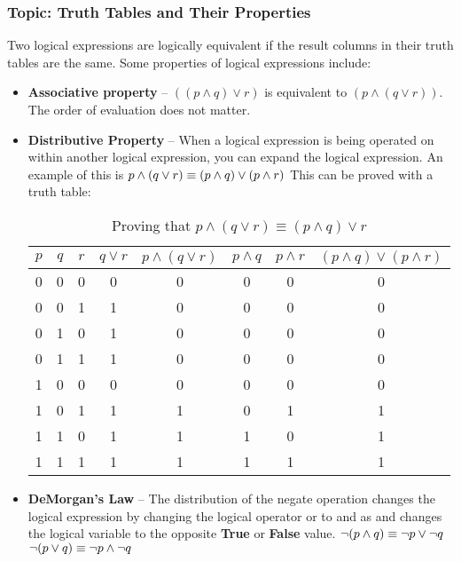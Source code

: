 \documentclass{article}
\begin{document}
\subsubsection{Topic: Truth Tables and Their Properties}

Two logical expressions are logically equivalent if the result columns in their truth tables are the same. Some properties of logical expressions include:
\begin{itemize}
  \item \textbf{Associative property} – $((p \land q) \lor r)$ is equivalent to $(p \land (q \lor r))$. The order of evaluation does not matter.

  \item \textbf{Distributive Property} – When a logical expression is being operated on within another logical expression, you can expand the logical expression.
An example of this is $p\wedge(q\vee r) \equiv (p\wedge q)\vee(p \wedge r)\\$
This can be proved with a truth table:

\begin{table}[ht]
    \centering
    \begin{tabular}{|c|c|c|c|c|c|c|c|} \hline 
         $p$&  $q$&  $r$&  $q \vee r$&  $p \wedge (q\vee r)$&  $p \wedge q$&  $p \wedge r$& $(p\wedge q)\vee(p \wedge r)$\\ \hline 
         0&  0&  0&  0&  0&  0&  0& 0\\ \hline 
         0&  0&  1&  1&  0&  0&  0& 0\\ \hline 
         0&  1&  0&  1&  0&  0&  0& 0\\ \hline 
         0&  1&  1&  1&  0&  0&  0& 0\\ \hline 
         1&  0&  0&  0&  0&  0&  0& 0\\ \hline 
         1&  0&  1&  1&  1&  0&  1& 1\\ \hline 
         1&  1&  0&  1&  1&  1&  0& 1\\ \hline 
         1&  1&  1&  1&  1&  1&  1& 1\\ \hline
    \end{tabular}
    \caption{Proving that $p\wedge(q\vee r) \equiv (p\wedge q)\vee r$}
    \label{tab:my_label_four}
\end{table}

  \item \textbf{DeMorgan’s Law} – The distribution of the negate operation changes the logical expression by changing the logical operator or to and as and changes the logical variable to the opposite \textbf{True} or \textbf{False} value.
$\neg(p\wedge q) \equiv \neg p \vee \neg q \\$
$\neg(p\vee q) \equiv \neg p \wedge \neg q\\$
\end{itemize}
\end{document}
